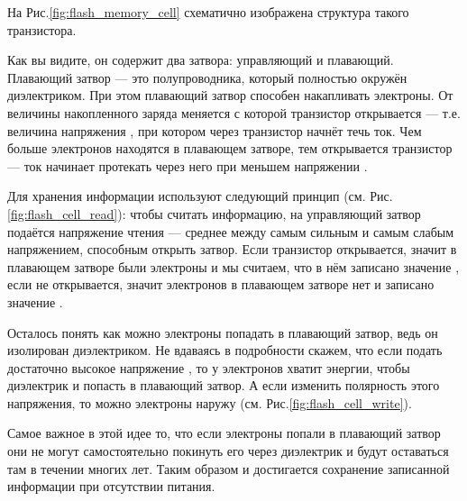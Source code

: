 \par{На Рис.\ref{fig:flash_memory_cell} схематично изображена структура такого транзистора.}

\par{Как вы видите, он содержит два затвора: управляющий и плавающий. Плавающий затвор --- это полупроводника, который полностью окружён диэлектриком. При этом плавающий затвор способен накапливать электроны. От величины накопленного заряда меняется  с которой транзистор открывается --- т.е. величина напряжения , при котором через транзистор начнёт течь ток. Чем больше электронов находятся в плавающем затворе, тем  открывается транзистор --- ток начинает протекать через него при меньшем напряжении .}

\par{Для хранения информации используют следующий принцип (см. Рис.\ref{fig:flash_cell_read}): чтобы считать информацию, на управляющий затвор подаётся напряжение чтения --- среднее между самым сильным и самым слабым напряжением, способным открыть затвор. Если транзистор открывается, значит в плавающем затворе были электроны и мы считаем, что в нём записано значение , если не открывается, значит электронов в плавающем затворе нет и записано значение .}

% 

\par{Осталось понять как можно  электроны попадать в плавающий затвор, ведь он изолирован диэлектриком. Не вдаваясь в подробности скажем, что если подать достаточно высокое напряжение , то у электронов хватит энергии, чтобы  диэлектрик и попасть в плавающий затвор. А если изменить полярность этого напряжения, то можно  электроны наружу (см. Рис.\ref{fig:flash_cell_write}).}

% 

\par{Самое важное в этой идее то, что если электроны попали в плавающий затвор они не могут самостоятельно покинуть его через диэлектрик и будут оставаться там в течении многих лет. Таким образом и достигается сохранение записанной информации при отсутствии питания.}

